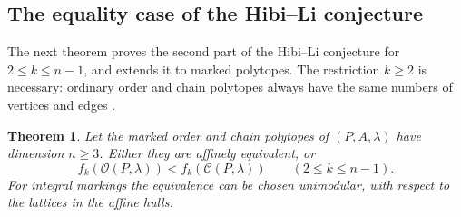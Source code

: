 \documentclass[a4paper,12pt]{amsart}
\newtheorem{theorem}{Theorem}[section]
\theoremstyle{definition}
\theoremstyle{remark}
\newcommand{\OO}{\mathcal O}
\newcommand{\CC}{\mathcal C}
\begin{document}
\subsection{The equality case of the Hibi--Li conjecture}
The next theorem proves the second part of the Hibi--Li conjecture \cite[Conjecture~2.4(b)]{HL16} for $2\leq k\leq n-1$, and extends it to marked polytopes.
The restriction $k\geq2$ is necessary: ordinary order and chain polytopes always have the same numbers of vertices and edges \cite{Sta86,Hib+17}.

\begin{theorem}\label{thm:marked-strictness}
Let the marked order and chain polytopes of $(P,A,\lambda)$ have dimension $n\geq3$.
Either they are affinely equivalent, or
\[
 f_k(\OO(P,\lambda))<f_k(\CC(P,\lambda))
 \qquad(2\leq k\leq n-1).
\]
For integral markings the equivalence can be chosen unimodular, with respect to the lattices in the affine hulls.
\end{theorem}
\end{document}
